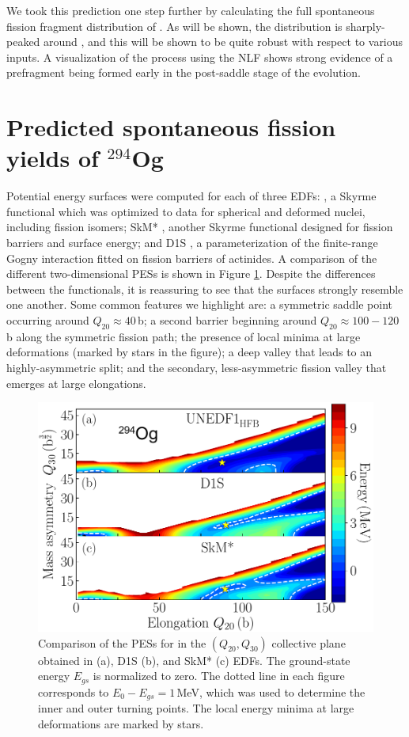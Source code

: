 We took this prediction one step further by calculating the full spontaneous fission fragment distribution of {\Og}. As will be shown, the distribution is sharply-peaked around {\Pb}, and this will be shown to be quite robust with respect to various inputs. A visualization of the process using the NLF shows strong evidence of a {\Pb} prefragment being formed early in the post-saddle stage of the evolution.

\section{Predicted spontaneous fission yields of $^{294}$Og}

Potential energy surfaces were computed for each of three EDFs: \hfb \cite{Schunck2015}, a Skyrme functional which was optimized to data for spherical and deformed nuclei, including fission isomers; SkM* \cite{Bartel1982}, another Skyrme functional designed for fission barriers and surface energy; and D1S \cite{Berger1989}, a parameterization of the finite-range Gogny interaction fitted on fission barriers of actinides. A comparison of the different two-dimensional PESs is shown in Figure \ref{fig:294ogthreepes}. Despite the differences between the functionals, it is reassuring to see that the surfaces strongly resemble one another. Some common features we highlight are: a symmetric saddle point occurring around $Q_{20}\approx 40$\,b; a second barrier beginning around $Q_{20}\approx100-120$\,b along the symmetric fission path; the presence of local minima at large deformations (marked by stars in the figure); a deep valley that leads to an highly-asymmetric split; and the secondary, less-asymmetric fission valley that emerges at large elongations.


\begin{figure}
	\centering
	\includegraphics[width=0.7\linewidth]{TeX_files/294Og_three_PES}
	\caption[PES comparison for $^{294}$Og using EDFs {\hfb}, D1S, and SkM*.]{Comparison of the PESs for \Og{} in the $(Q_{20},Q_{30})$ collective plane obtained in \hfb{} (a), D1S (b), and SkM* (c) EDFs. The ground-state energy $E_{gs}$ is normalized to zero. The dotted line in each figure corresponds to $E_0-E_{gs}=1$\,MeV, which was used to determine the inner and outer turning points. The local energy minima at large deformations are marked by stars.}
	\label{fig:294ogthreepes}
\end{figure}

